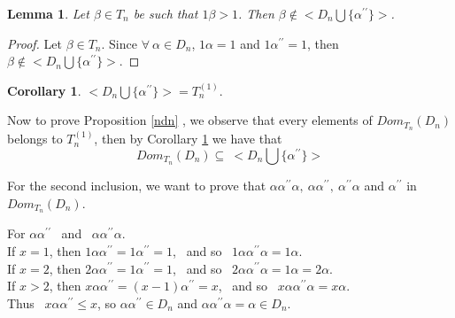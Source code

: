 \documentclass[10pt]{extarticle}
\numberwithin{equation}{section}
\numberwithin{bbb}{section}
\newtheorem{lemma}{Lemma}[section]
\newtheorem{corollary}{Corollary}[section]
\numberwithin{equation}{section}
\begin{document}
\begin{lemma}
  Let $\beta \in T_n$ be such that $1\beta>1$. Then $\beta \notin <D_n \bigcup \{\alpha^{\prime\prime}\}>$.
\end{lemma}

\begin{proof}
   Let $\beta \in T_n$. Since $\forall \ \alpha\in D_n$, $1\alpha=1$ and $1\alpha^{\prime\prime}=1$, then $\beta \notin <D_n \bigcup \{{\alpha^{\prime\prime}}\}>$.
\end{proof}

\vspace{0.5cm}
\begin{corollary}\label{nmn}
  $<D_n \bigcup \{\alpha^{\prime\prime}\}>=T_n^{(1)}.$  
\end{corollary}

\vspace{0.5cm}
Now to prove Proposition \ref{ndn} , we observe that every elements of $Dom_{T_n}(D_n)$ belongs to $T_n^{(1)}$, then by Corollary \ref{nmn} we have that
$$Dom_{T_n}(D_n) \subseteq \ <D_n \bigcup \{{\alpha^{\prime\prime}}\}>$$

\vspace{0.5cm}
For the second inclusion, we want to prove that $\alpha\alpha^{\prime\prime}\alpha, \ \alpha\alpha^{\prime\prime},\ \alpha^{\prime\prime}\alpha$ and $\alpha^{\prime\prime}$ in $Dom_{T_n}(D_n)$.

\vspace{0.5cm}
For $\alpha\alpha^{\prime\prime}$ \ and \ $\alpha\alpha^{\prime\prime}\alpha$.\\ 
\vspace{0.1cm}
 If $x=1$, then $1\alpha\alpha^{\prime\prime}=1\alpha^{\prime\prime}=1$, \ and so \ $1\alpha\alpha^{\prime\prime}\alpha=1\alpha$.\\ 
\vspace{0.1cm}
If $x=2$, then $2\alpha\alpha^{\prime\prime}=1\alpha^{\prime\prime}=1$, \ and so \  $2\alpha\alpha^{\prime\prime}\alpha=1\alpha=2\alpha$.\\
\vspace{0.1cm}
If $x>2$, then $x\alpha\alpha^{\prime\prime}=(x-1)\alpha^{\prime\prime}=x$, \ and so \ $x\alpha\alpha^{\prime\prime}\alpha=x\alpha$.\\ Thus \
$x\alpha\alpha^{\prime\prime} \leq x$, so
$\alpha\alpha^{\prime\prime} \in D_n$ and $\alpha\alpha^{\prime\prime}\alpha=\alpha \in D_n$.
\end{document}
